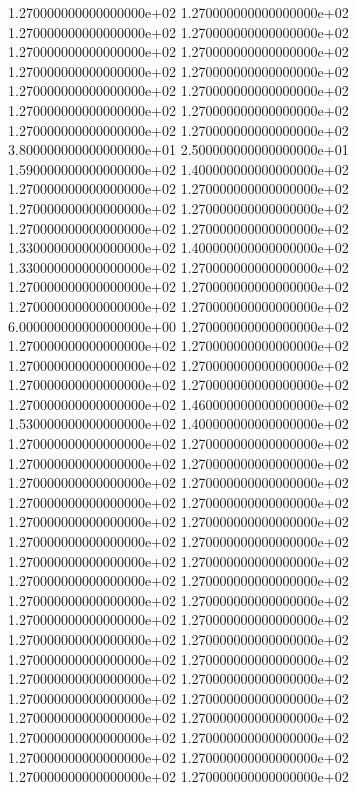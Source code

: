 1.270000000000000000e+02 1.270000000000000000e+02 1.270000000000000000e+02 1.270000000000000000e+02 1.270000000000000000e+02 1.270000000000000000e+02 1.270000000000000000e+02 1.270000000000000000e+02 1.270000000000000000e+02 1.270000000000000000e+02 1.270000000000000000e+02 1.270000000000000000e+02 1.270000000000000000e+02 1.270000000000000000e+02 3.800000000000000000e+01 2.500000000000000000e+01 1.590000000000000000e+02 1.400000000000000000e+02 1.270000000000000000e+02 1.270000000000000000e+02 1.270000000000000000e+02 1.270000000000000000e+02 1.270000000000000000e+02 1.270000000000000000e+02 1.330000000000000000e+02 1.400000000000000000e+02 1.330000000000000000e+02 1.270000000000000000e+02 1.270000000000000000e+02 1.270000000000000000e+02 1.270000000000000000e+02 1.270000000000000000e+02 6.000000000000000000e+00 1.270000000000000000e+02 1.270000000000000000e+02 1.270000000000000000e+02 1.270000000000000000e+02 1.270000000000000000e+02 1.270000000000000000e+02 1.270000000000000000e+02 1.270000000000000000e+02 1.460000000000000000e+02 1.530000000000000000e+02 1.400000000000000000e+02 1.270000000000000000e+02 1.270000000000000000e+02 1.270000000000000000e+02 1.270000000000000000e+02 1.270000000000000000e+02 1.270000000000000000e+02 1.270000000000000000e+02 1.270000000000000000e+02 1.270000000000000000e+02 1.270000000000000000e+02 1.270000000000000000e+02 1.270000000000000000e+02 1.270000000000000000e+02 1.270000000000000000e+02 1.270000000000000000e+02 1.270000000000000000e+02 1.270000000000000000e+02 1.270000000000000000e+02 1.270000000000000000e+02 1.270000000000000000e+02 1.270000000000000000e+02 1.270000000000000000e+02 1.270000000000000000e+02 1.270000000000000000e+02 1.270000000000000000e+02 1.270000000000000000e+02 1.270000000000000000e+02 1.270000000000000000e+02 1.270000000000000000e+02 1.270000000000000000e+02 1.270000000000000000e+02 1.270000000000000000e+02 1.270000000000000000e+02 1.270000000000000000e+02 1.270000000000000000e+02 1.270000000000000000e+02
